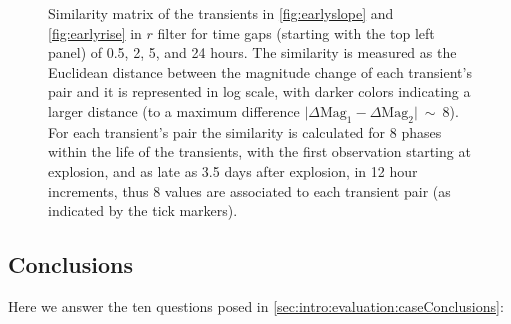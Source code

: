 \begin{figure}[hbt]


    \caption{Similarity matrix of the transients in \autoref{fig:earlyslope} and \autoref{fig:earlyrise} in $r$ filter for time gaps (starting with the top left panel) of  0.5, 2, 5, and 24 hours.  The similarity is measured as the Euclidean distance between the magnitude change of each transient's pair and it is represented in log scale, with darker colors indicating a larger distance (to a maximum difference $\lvert{\Delta\mathrm{Mag}_1 - \Delta\mathrm{Mag}_2}\rvert ~\sim~8$). For each transient's pair the similarity is calculated for 8 phases within the life of the transients, with the first observation starting at explosion, and as late as 3.5 days after explosion, in 12 hour increments, thus 8 values are associated to each transient pair (as indicated by the tick markers).}
  \label{fig:simmatrix}
\end{figure}


 \subsection{Conclusions}

 Here we answer the ten questions posed in
 \autoref{sec:intro:evaluation:caseConclusions}:

